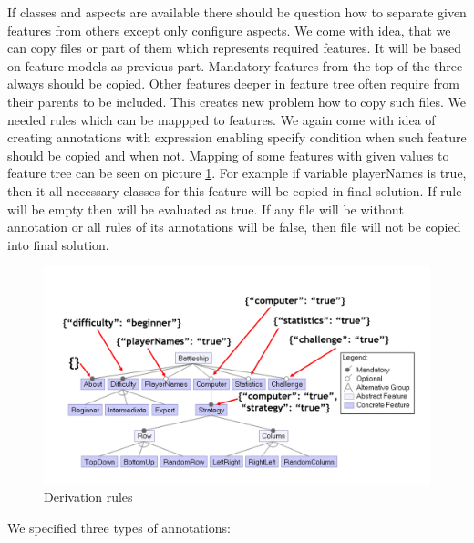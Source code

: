 \documentclass[11pt,slovak,a4paper,twoside]{article}
\begin{document}
If classes and aspects are available there should be question how to separate given features from others except only configure aspects.
We come with idea, that we can copy files or part of them which represents required features. It will be based on feature models as previous part. Mandatory features from the top of the three always should be copied. Other features deeper in feature tree often require from their parents to be included. This creates new problem how to copy such files. We needed rules which can be mappped to features. We again come with idea of creating annotations with expression enabling specify condition when such feature should be copied and when not. Mapping of some features with given values to feature tree can be seen on picture \ref{derivationRules}. For example if variable playerNames is true, then it all necessary classes for this feature will be copied in final solution. If rule will be empty then will be evaluated as true. If any  file will be without annotation or all rules of its annotations will be false, then file will not be copied into final solution.

\begin{figure}[H]  %
					\begin{center}
									\includegraphics[width=\linewidth]{fig/derivationRules.png}
									\caption{Derivation rules}
									\label{derivationRules}
					\end{center}
\end{figure}


We specified three types of annotations:
\end{document}
